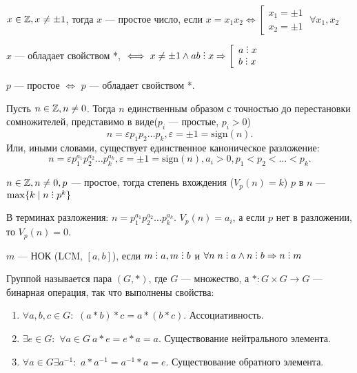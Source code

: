 \begin{definition}
    $x \in \mathbb{Z}, x \neq \pm 1$, тогда  $x$ --- простое число, если $x = x_1x_2 \iff \left[ \begin{array}{l} x_1 = \pm 1 \\ x_2 = \pm 1 \end{array} \right. \; \forall x_1, x_2$
\end{definition}
\begin{property}[*]
    $x$ --- обладает свойством  *, $\iff x \neq \pm 1 \land ab \divby x \Rightarrow \left[ \begin{array}{l} a \divby x \\ b \divby x \end{array} \right.$ 
\end{property}
\begin{statement}
    $p$ --- простое  $\iff$ $p$ --- обладает свойством *. \\
\end{statement}
\begin{theorem}
    Пусть $n \in \mathbb{Z}, n \neq 0$. Тогда  $n$ единственным образом с точностью до перестановки сомножителей, представимо в виде($p_i$ --- простые, $p_i > 0$)  \[
        n = \varepsilon p_1p_2\ldots p_k, \varepsilon = \pm 1 = \text{sign}(n)
    .\] 
    Или, иными словами, существует единственное каноническое разложение: \[
	    n = \varepsilon p_1 ^ {a_1} p_2 ^ {a_2} \ldots p_k ^ {a_k}, \varepsilon = \pm 1 = \text{sign}(n), a_i > 0, p_1 < p_2 < \ldots < p_k
    .\]
\end{theorem}
\begin{definition}
    $n \in \mathbb{Z}, n \neq 0, p$ --- простое, тогда степень вхождения ($V_p(n) = k$)  $p$ в  $n$ ---  $\max\{k \mid n \divby p^k\}$

    В терминах разложения: $n = p_1^{a_1} p_2^{a_2} \ldots p_k^{a_k}$. $V_p(n) = a_i$, а если  $p$ нет в разложении, то  $V_p(n) = 0$.
\end{definition}
        \begin{definition}
            $m$ --- НОК (LCM, $[a, b]$), если $m \divby a, m \divby b$ и  $\forall n\; n \divby a \land n \divby b \Rightarrow n \divby m$
        \end{definition}
 \begin{definition}
     Группой называется пара $(G, \ast)$, где  $G$ --- множество, а  $\ast: G \times G \to G$ --- бинарная операция, так что выполнены свойства:
     \begin{enumerate}
         \item $\forall a,b,c \in G:$  $(a \ast b) \ast c = a \ast (b \ast c)$. Ассоциативность.
         \item $\exists e \in G:$ $\forall a \in G\  a \ast e = e \ast a = a$. Существование нейтрального элемента.
         \item $\forall a \in G \exists a^{-1}:$  $a \ast a^{-1} = a^{-1} \ast a = e$. Существование обратного элемента.
     \end{enumerate}
 \end{definition}

